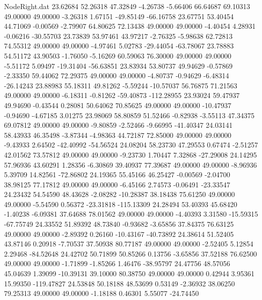 \begin{filecontents}{NodeRight.dat}
  23.62684   52.26318   47.32849    -4.26738   -5.66406   66.64687   69.10313   49.00000   49.00000   -3.26318    1.67151  -49.85149  -66.16758
  23.67751   53.40454   44.71069    -0.00569   -2.79907   64.80625   72.13438   49.00000   49.00000   -4.40454    4.28931   -0.06216  -30.55703
  23.73839   53.97461   43.97217    -2.76325   -5.98638   62.72813   74.55312   49.00000   49.00000   -4.97461    5.02783  -29.44054  -63.78067
  23.78883   54.51172   43.90503    -1.76050   -5.16269   60.59063   76.30000   49.00000   49.00000   -5.51172    5.09497  -19.31404  -56.63851
  23.83934   53.80737   49.94629    -0.57869   -2.33350   59.44062   72.29375   49.00000   49.00000   -4.80737   -0.94629   -6.48314  -26.14243
  23.88983   55.18311   49.81262    -5.59244  -10.57037   56.76875   71.21563   49.00000   49.00000   -6.18311   -0.81262  -59.40873 -112.28955
  23.93024   59.47937   49.94690    -0.43544    0.28081   50.64062   70.85625   49.00000   49.00000  -10.47937   -0.94690   -4.67185    3.01275
  23.98069   58.80859   51.52466    -0.82938   -3.55113   47.34375   69.07812   49.00000   49.00000   -9.80859   -2.52466   -9.66995  -41.40347
  24.03141   58.43933   46.35498    -3.87344   -4.98363   44.72187   72.85000   49.00000   49.00000   -9.43933    2.64502  -42.40992  -54.56524
  24.08204   58.23730   47.29553     0.67474   -2.51257   42.01562   73.57812   49.00000   49.00000   -9.23730    1.70447    7.32868  -27.29008
  24.14295   57.96936   43.60291     1.28356   -6.30869   39.40937   77.39687   49.00000   49.00000   -8.96936    5.39709   14.82561  -72.86802
  24.19365   55.45166   46.25427    -0.00569   -2.04700   38.98125   77.17812   49.00000   49.00000   -6.45166    2.74573   -0.06491  -23.33547
  24.23432   54.54590   48.43628    -2.08282  -10.28387   38.18438   75.61250   49.00000   49.00000   -5.54590    0.56372  -23.31818 -115.13309
  24.28494   53.40393   45.68420    -1.40238   -6.09381   37.64688   78.01562   49.00000   49.00000   -4.40393    3.31580  -15.59315  -67.75749
  24.33552   51.89392   48.73840    -0.93682   -3.65856   37.84375   76.63125   49.00000   49.00000   -2.89392    0.26160  -10.43167  -40.73892
  24.38614   51.52405   43.87146     0.20918   -7.70537   37.50938   80.77187   49.00000   49.00000   -2.52405    5.12854    2.29468  -84.52648
  24.42702   50.71899   50.85266     0.13756   -3.65856   37.52188   76.62500   49.00000   49.00000   -1.71899   -1.85266    1.46476  -38.95797
  24.47756   48.57056   45.04639     1.39099  -10.39131   39.10000   80.38750   49.00000   49.00000    0.42944    3.95361   15.99350 -119.47827
  24.53848   50.18188   48.53699     0.53149   -2.36932   38.06250   79.25313   49.00000   49.00000   -1.18188    0.46301    5.55077  -24.74450

\end{filecontents}
